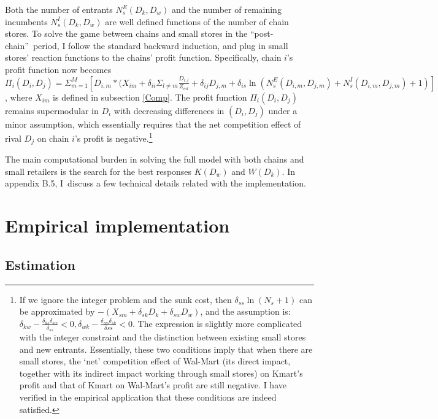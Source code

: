\documentclass[notitlepage,onecolumn,11pt]{article}
\begin{document}
Both the number of entrants $N_{s}^{E}(D_{k},D_{w})$ and the number of
remaining incumbents $N_{s}^{I}(D_{k},D_{w})$ are well defined functions of
the number of chain stores. To solve the game between chains and small
stores in the \textquotedblleft post-chain\textquotedblright\ period, I
follow the standard backward induction, and plug in small stores' reaction
functions to the chains' profit function. Specifically, chain $i$'s profit
function now becomes $\Pi _{i}(D_{i},D_{j})=\Sigma _{m=1}^{M}[D_{i,m}\ast
(X_{im}+\delta _{ii}\Sigma _{l\neq m}\frac{D_{i,l}}{Z_{ml}}+\delta
_{ij}D_{j,m}+\delta _{is}\ln
(N_{s}^{E}(D_{i,m},D_{j,m})+N_{s}^{I}(D_{i,m},D_{j,m})+1)]$, where $X_{im}$
is defined in subsection \ref{Comp}. The profit function $\Pi
_{i}(D_{i},D_{j})$ remains supermodular in $D_{i}$ with decreasing
differences in $(D_{i},D_{j})$ under a minor assumption, which essentially
requires that the net competition effect of rival $D_{j}$ on chain $i$'s
profit is negative.\footnote{%
If we ignore the integer problem and the sunk cost, then $\delta _{ss}\ln
(N_{s}+1)$ can be approximated by $-(X_{sm}+\delta _{sk}D_{k}+\delta
_{sw}D_{w})$, and the assumption is: $\delta _{kw}-\frac{\delta _{ks}\delta
_{sw}}{\delta _{ss}}<0,\delta _{wk}-\frac{\delta _{ws}\delta _{sk}}{\delta ss%
}<0.$ The expression is slightly more complicated with the integer
constraint and the distinction between existing small stores and new
entrants. Essentially, these two conditions imply that when there are small
stores, the `net' competition effect of Wal-Mart (its direct impact,
together with its indirect impact working through small stores) on Kmart's
profit and that of Kmart on Wal-Mart's profit are still negative. I have
verified in the empirical application that these conditions are indeed
satisfied.}

The main computational burden in solving the full model with both chains and
small retailers is the search for the best responses $K(D_{w})$ and $%
W(D_{k}).$ In appendix B.5, I\ discuss a few technical details related with
the implementation.

\section{Empirical implementation\label{Empirical}}

\subsection{Estimation}
\end{document}
